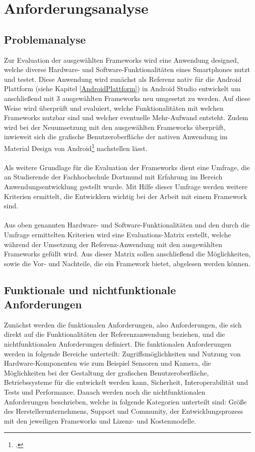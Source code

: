 \chapter{Anforderungsanalyse} \label{Anforderungsanalyse}


\section{Problemanalyse}

Zur Evaluation der ausgewählten Frameworks wird eine Anwendung designed, welche diverse Hardware- und Software-Funktionalitäten eines Smartphones nutzt und testet. Diese Anwendung wird zunächst als Referenz nativ für die Android Plattform (siehe Kapitel \ref{AndroidPlattform}) in Android Studio entwickelt um anschließend mit 3 ausgewählten Frameworks neu umgesetzt zu werden. Auf diese Weise wird überprüft und evaluiert, welche Funktionalitäten mit welchen Frameworks nutzbar sind und welcher eventuelle Mehr-Aufwand entsteht. Zudem wird bei der Neuumsetzung mit den ausgewählten Frameworks überprüft, inwieweit sich die grafische Benutzeroberfläche der nativen Anwendung im Material Design von Android\footcite{MaterialDesignHP} nachstellen lässt. 
\\
\\
Als weitere Grundlage für die Evaluation der Frameworks dient eine Umfrage, die an Studierende der Fachhochschule Dortmund mit Erfahrung im Bereich Anwendungsentwicklung gestellt wurde. Mit Hilfe dieser Umfrage werden weitere Kriterien ermittelt, die Entwicklern wichtig bei der Arbeit mit einem Framework sind.
\\
\\
Aus oben genannten Hardware- und Software-Funktionalitäten und den durch die Umfrage ermittelten Kriterien wird eine Evaluations-Matrix erstellt, welche während der Umsetzung der Referenz-Anwendung mit den ausgewählten Frameworks gefüllt wird. Aus dieser Matrix sollen anschließend die Möglichkeiten, sowie die Vor- und Nachteile, die ein Framework bietet, abgelesen werden können.

\section{Funktionale und nichtfunktionale Anforderungen}

Zunächst werden die funktionalen Anforderungen, also Anforderungen, die sich direkt auf die Funktionalitäten der Referenzanwendung beziehen, und die nichtfunktionalen Anforderungen definiert. Die funktionalen Anforderungen werden in folgende Bereiche unterteilt: Zugriffsmöglichkeiten und Nutzung von Hardware-Komponenten wie zum Beispiel Sensoren und Kamera, die Möglichkeiten bei der Gestaltung der grafischen Benutzeroberfläche, Betriebssysteme für die entwickelt werden kann, Sicherheit, Interoperabilität und Tests und Performance. Danach werden noch die nichtfunktionalen Anforderungen beschrieben, welche in folgende Kategorien unterteilt sind: Größe des Herstellerunternehmens, Support und Community, der Entwicklungsprozess mit den jeweiligen Frameworks und Lizenz- und Kostenmodelle. 

